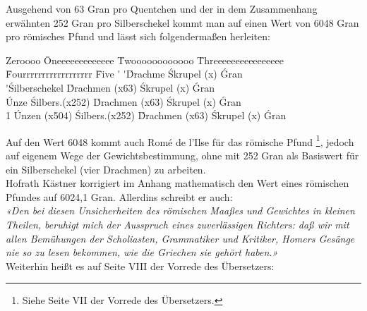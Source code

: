 \documentclass[a5paper,8pt]{scrbook}
\newcommand\gransofquentins{63}
\begin{document}
Ausgehend von 63 Gran pro Quentchen
und der in dem Zusammenhang erwähnten 252 Gran pro Silberschekel
kommt man auf einen Wert von 6048 Gran pro römisches Pfund
und lässt sich folgendermaßen herleiten:\\

\noindent
\begin{minipage}{\linewidth}
	\FPeval{} %
\begin{tabbing}
Zeroooo  \= Oneeeeeeeeeeeee \= Twoooooooooooo    \= Threeeeeeeeeeeeeeee \= Fourrrrrrrrrrrrrrrrrr \= Five      \kill
         \>  \'             \>  \'               \'Drachme          \'Skrupel (x\scruplesofquentins)    \'Gran \\
         \>  \'             \'Silberschekel  \'Drachmen (x\gransofquentins)   \'Skrupel (x\scruplesofquentins)    \'Gran \\
         \'Unze         \'Silbers.(x252) \'Drachmen (x\gransofquentins)   \'Skrupel (x\scruplesofquentins)    \'Gran \\
1 \Pfund {}\'Unzen (x504) \'Silbers.(x252) \'Drachmen (x\gransofquentins)   \'Skrupel (x\scruplesofquentins)    \'Gran \\
\end{tabbing}
\end{minipage}

Auf den Wert 6048 kommt auch  Romé de l'Ilse
für das römische Pfund%
\footnote{Siehe Seite VII der Vorrede des Übersetzers.},
jedoch auf eigenem Wege der Gewichtsbestimmung,
ohne mit 252 Gran als Basiswert
für ein Silberschekel (vier Drachmen) zu arbeiten.\\

Hofrath Kästner korrigiert im Anhang mathematisch
den Wert eines römischen Pfundes auf 6024,1 Gran.
Allerdins schreibt er auch:\\

\emph{«Den bei diesen Unsicherheiten des römischen Maaßes
und Gewichtes in kleinen Theilen,
beruhigt mich der Ausspruch eines zuverlässigen Richters:
daß wir mit allen Bemühungen der Scholiasten, Grammatiker und Kritiker,
Homers Gesänge nie so zu lesen bekommen,
wie die Griechen sie gehört haben.»}\\

Weiterhin heißt es auf Seite VIII der Vorrede des Übersetzers:\\
\end{document}
